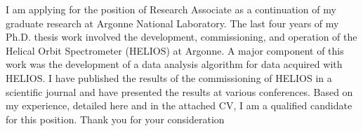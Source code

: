 I am applying for the position of Research Associate as a continuation of my graduate research at Argonne National Laboratory.  The last four years of my Ph.D. thesis work involved the development, commissioning, and operation of the Helical Orbit Spectrometer (HELIOS) at Argonne.  A major component of this work was the development of a data analysis algorithm for data acquired with HELIOS.  I have published the results of the commissioning of HELIOS in a scientific journal and have presented the results at various conferences. 
Based on my experience, detailed here and in the attached CV, I am a qualified candidate for this position.
Thank you for your consideration